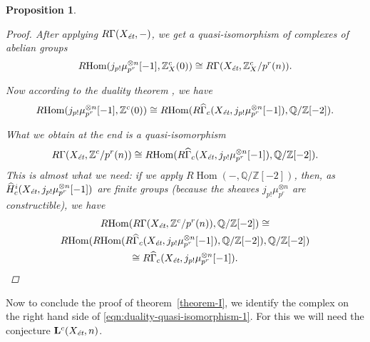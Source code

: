 \documentclass[leqno,12pt]{article}
\theoremstyle{plain}
\newtheorem{proposition}[theorem]{\indent\sc Proposition}
\theoremstyle{definition}
\DeclareMathOperator{\Hom}{Hom}
\newcommand{\QQ}{\mathbb{Q}}
\newcommand{\ZZ}{\mathbb{Z}}
\newcommand{\et}{\text{\it \'{e}t}}
\newcommand{\RHom}{R\!\Hom}
\begin{document}
\begin{proposition}
\begin{proof}
    After applying $R\Gamma (X_\et, -)$, we get a quasi-isomorphism of
    complexes of abelian groups
    \begin{equation}
      \RHom (j_{p!} \mu_{p^r}^{\otimes n} [-1], \ZZ^c_X (0)) \cong
      R\Gamma (X_\et, \ZZ^c_X/p^r (n)).
    \end{equation}

    Now according to the duality theorem \cite[Theorem~7.8]{Geisser-2010},
    we have
    \begin{equation}
      \RHom (j_{p !} \mu_{p^r}^{\otimes n} [-1], \ZZ^c (0)) \cong
      \RHom (R\widehat{\Gamma}_c (X_\et, j_{p !} \mu_{p^r}^{\otimes n} [-1]), \QQ/\ZZ [-2]).
    \end{equation}

    What we obtain at the end is a quasi-isomorphism
    \[ R\Gamma (X_\et, \ZZ^c/p^r (n)) \cong
    \RHom (R\widehat{\Gamma}_c (X_\et, j_{p !} \mu_{p^r}^{\otimes n} [-1]), \QQ/\ZZ [-2]). \]
    This is almost what we need: if we apply $\RHom (-,\QQ/\ZZ [-2])$, then, as
    $\widehat{H}^i_c (X_\et, j_{p!} \mu_{p^r}^{\otimes n} [-1])$ are
    finite groups (because the sheaves $j_{p!} \mu_{p^r}^{\otimes n}$ are
    constructible), we have
    \begin{multline*}
      \RHom (R\Gamma (X_\et, \ZZ^c/p^r (n)), \QQ/\ZZ[-2]) \cong\\
      \RHom (\RHom (R\widehat{\Gamma}_c (X_\et, j_{p !} \mu_{p^r}^{\otimes n} [-1]), \QQ/\ZZ[-2]), \QQ/\ZZ[-2]) \\
      \cong R\widehat{\Gamma}_c (X_\et, j_{p !} \mu_{p^r}^{\otimes n} [-1]). \qedhere
    \end{multline*}
  \end{proof}
\end{proposition}

Now to conclude the proof of theorem~\ref{theorem-I}, we identify the complex
on the right hand side of \eqref{eqn:duality-quasi-isomorphism-1}. For this we
will need the conjecture $\mathbf{L}^c (X_\et, n)$.
\end{document}
